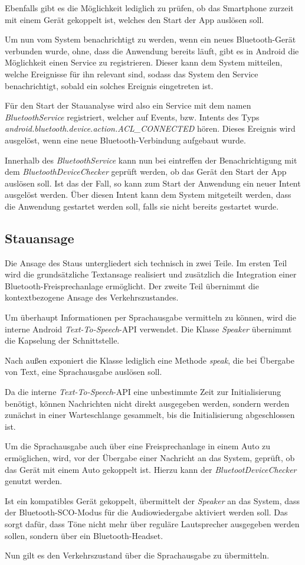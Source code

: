 Ebenfalls gibt es die Möglichkeit lediglich zu prüfen, ob das Smartphone zurzeit mit einem Gerät gekoppelt ist, welches den Start der App auslösen soll.

Um nun vom System benachrichtigt zu werden, wenn ein neues Bluetooth-Gerät verbunden wurde, ohne, dass die Anwendung bereits läuft, gibt es in Android die Möglichkeit einen Service zu registrieren.
Dieser kann dem System mitteilen, welche Ereignisse für ihn relevant sind, sodass das System den Service benachrichtigt, sobald ein solches Ereignis eingetreten ist.

Für den Start der Stauanalyse wird also ein Service mit dem namen {\em BluetoothService} registriert, welcher auf Events, bzw. Intents des Typs {\em android.bluetooth.device.action.ACL\_CONNECTED} hören. Dieses Ereignis wird ausgelöst, wenn eine neue Bluetooth-Verbindung aufgebaut wurde.

Innerhalb des {\em BluetoothService} kann nun bei eintreffen der Benachrichtigung mit dem {\em BluetoothDeviceChecker} geprüft werden, ob das Gerät den Start der App auslösen soll. Ist das der Fall, so kann zum Start der Anwendung ein neuer Intent ausgelöst werden. Über diesen Intent kann dem System mitgeteilt werden, dass die Anwendung gestartet werden soll, falls sie nicht bereits gestartet wurde.

\subsection{Stauansage}
Die Ansage des Staus untergliedert sich technisch in zwei Teile. Im ersten Teil wird die grundsätzliche Textansage realisiert und zusätzlich die Integration einer Bluetooth-Freisprechanlage ermöglicht.
Der zweite Teil übernimmt die kontextbezogene Ansage des Verkehrszustandes.

Um überhaupt Informationen per Sprachausgabe vermitteln zu können, wird die interne Android {\em Text-To-Speech}-API verwendet.
Die Klasse {\em Speaker} übernimmt die Kapselung der Schnittstelle.

Nach außen exponiert die Klasse lediglich eine Methode {\em speak}, die bei Übergabe von Text, eine Sprachausgabe auslösen soll.

Da die interne {\em Text-To-Speech}-API eine unbestimmte Zeit zur Initialisierung benötigt, können Nachrichten nicht direkt ausgegeben werden, sondern werden zunächst in einer Warteschlange gesammelt, bis die Initialisierung abgeschlossen ist.

Um die Sprachausgabe auch über eine Freisprechanlage in einem Auto zu ermöglichen, wird, vor der Übergabe einer Nachricht an das System, geprüft, ob das Gerät mit einem Auto gekoppelt ist. Hierzu kann der {\em BluetootDeviceChecker} genutzt werden.

Ist ein kompatibles Gerät gekoppelt, übermittelt der {\em Speaker} an das System, dass der Bluetooth-SCO-Modus für die Audiowiedergabe aktiviert werden soll. Das sorgt dafür, dass Töne nicht mehr über reguläre Lautsprecher ausgegeben werden sollen, sondern über ein Bluetooth-Headset.

Nun gilt es den Verkehrszustand über die Sprachausgabe zu übermitteln.